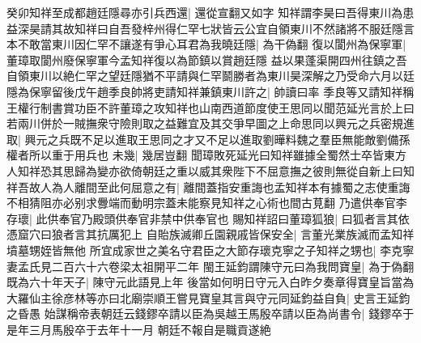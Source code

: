 癸卯知祥至成都趙廷隱尋亦引兵西還|{
	還從宣翻又如字}
知祥謂李昊曰吾得東川為患益深昊請其故知祥曰自吾發梓州得仁罕七狀皆云公宜自領東川不然諸將不服廷隱言本不敢當東川因仁罕不讓遂有爭心耳君為我曉廷隱|{
	為干偽翻}
復以閬州為保寧軍|{
	董璋取閬州廢保寧軍今孟知祥復以為節鎮以賞趙廷隱}
益以果蓬渠開四州往鎮之吾自領東川以絶仁罕之望廷隱猶不平請與仁罕鬬勝者為東川昊深解之乃受命六月以廷隱為保寧留後戊午趙季良帥將吏請知祥兼鎮東川許之|{
	帥讀曰率}
季良等又請知祥稱王權行制書賞功臣不許董璋之攻知祥也山南西道節度使王思同以聞范延光言於上曰若兩川併於一賊撫衆守險則取之益難宜及其交爭早圖之上命思同以興元之兵密規進取|{
	興元之兵既不足以進取王思同之才又不足以進取劉曄料魏之羣臣無能敵劉備孫權者所以重于用兵也}
未幾|{
	幾居豈翻}
聞璋敗死延光曰知祥雖據全蜀然士卒皆東方人知祥恐其思歸為變亦欲倚朝廷之重以威其衆陛下不屈意撫之彼則無從自新上曰知祥吾故人為人離間至此何屈意之有|{
	離間蓋指安重誨也孟知祥本有據蜀之志使重誨不相猜阻亦必别求釁端而動明宗蓋未能察見知祥之心術也間古莧翻}
乃遣供奉官李存瓌|{
	此供奉官乃殿頭供奉官非禁中供奉官也}
賜知祥詔曰董璋狐狼|{
	曰狐者言其依憑窟穴曰狼者言其抗厲犯上}
自貽族滅卿丘園親戚皆保安全|{
	言董光業族滅而孟知祥墳墓甥姪皆無他}
所宜成家世之美名守君臣之大節存瓌克寧之子知祥之甥也|{
	李克寧妻孟氏見二百六十六卷梁太祖開平二年}
閩王延鈞謂陳守元曰為我問寶皇|{
	為于偽翻}
既為六十年天子|{
	陳守元此語見上年}
後當如何明日守元入白昨夕奏章得寶皇旨當為大羅仙主徐彦林等亦曰北廟崇順王嘗見寶皇其言與守元同延鈞益自負|{
	史言王延鈞之昏愚}
始謀稱帝表朝廷云錢鏐卒請以臣為吳越王馬殷卒請以臣為尚書令|{
	錢鏐卒于是年三月馬殷卒于去年十一月}
朝廷不報自是職貢遂絶

